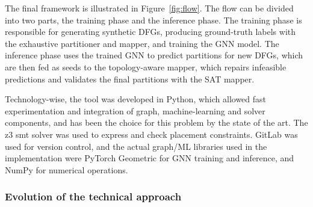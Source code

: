The final framework is illustrated in Figure~\ref{fig:flow}. The flow can be divided into two parts, the training phase and the inference phase. The training phase is responsible for generating synthetic DFGs, producing ground-truth labels with the exhaustive partitioner and mapper, and training the GNN model. The inference phase uses the trained GNN to predict partitions for new DFGs, which are then fed as seeds to the topology-aware mapper, which repairs infeasible predictions and validates the final partitions with the SAT mapper.

Technology-wise, the tool was developed in Python, which allowed fast experimentation and integration of graph, machine-learning and solver components, and has been the choice for this problem by the state of the art. The \gls{z3} \gls{smt} solver was used to express and check placement constraints. GitLab was used for version control, and the actual graph/ML libraries used in the implementation were PyTorch Geometric for GNN training and inference, and NumPy for numerical operations.

%
%
%

\subsubsection{Evolution of the technical approach}

